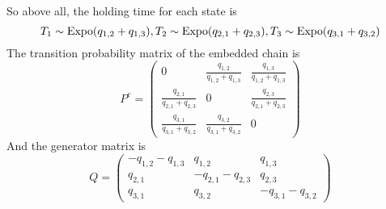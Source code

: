 \begin{homeworkProblem}
So above all, the holding time for each state is
$$T_1\sim\operatorname{Expo}(q_{1,2}+q_{1,3}), T_2\sim\operatorname{Expo}(q_{2,1}+q_{2,3}), T_3\sim\operatorname{Expo}(q_{3,1}+q_{3,2})$$
The transition probability matrix of the embedded chain is
$$P^e = \begin{pmatrix}
0 & \frac{q_{1,2}}{q_{1,2}+q_{1,3}} & \frac{q_{1,3}}{q_{1,2}+q_{1,3}} \\
\frac{q_{2,1}}{q_{2,1}+q_{2,3}} & 0 & \frac{q_{2,3}}{q_{2,1}+q_{2,3}} \\
\frac{q_{3,1}}{q_{3,1}+q_{3,2}} & \frac{q_{3,2}}{q_{3,1}+q_{3,2}} & 0
\end{pmatrix}$$
And the generator matrix is
$$Q = \begin{pmatrix}
-q_{1,2}-q_{1,3} & q_{1,2} & q_{1,3} \\
q_{2,1} & -q_{2,1}-q_{2,3} & q_{2,3} \\
q_{3,1} & q_{3,2} & -q_{3,1}-q_{3,2}
\end{pmatrix}$$

\end{homeworkProblem}

\newpage